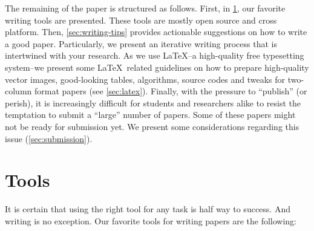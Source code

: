 \documentclass[authoryear,12pta4paper,fleqn]{article}
\numberwithin{equation}{section}
\theoremstyle{remark}
\begin{document}
The remaining of the paper is structured as follows. First, in \cref{sec:tools}, our favorite writing tools are presented. These tools are mostly open source and cross platform. Then, \cref{sec:writing-tips} provides actionable suggestions on how to write a good paper.  Particularly, we present an iterative writing process that is intertwined with your research. 
As we use \LaTeX--a high-quality free typesetting system--we present some \LaTeX\ related guidelines on how to prepare high-quality vector images, good-looking tables, algorithms, source codes and tweaks for two-column format papers (see \cref{sec:latex}). 
Finally, with the pressure to “publish” (or perish), it is increasingly difficult for students and researchers alike to resist the temptation to submit a “large” number of papers. Some of these papers might not be ready for submission yet. We present some considerations regarding this issue (\cref{sec:submission}).






\section{Tools}\label{sec:tools}

It is certain that using the right tool for any task is half way to success. And writing is no exception. Our favorite tools for writing papers are the following:
\end{document}
